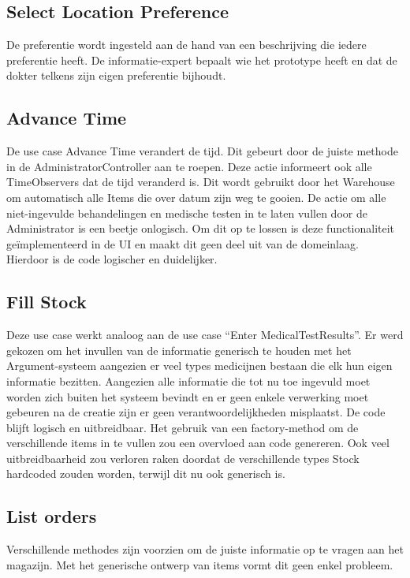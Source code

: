 \subsection{Select Location Preference}
De preferentie wordt ingesteld aan de hand van een beschrijving die iedere preferentie heeft. 
De informatie-expert bepaalt wie het prototype heeft en dat de dokter telkens zijn eigen preferentie bijhoudt.

\subsection{Advance Time}
De use case Advance Time verandert de tijd. Dit gebeurt door de juiste methode in de AdministratorController aan te roepen. 
Deze actie informeert ook alle TimeObservers dat de tijd veranderd is. Dit wordt gebruikt door het Warehouse om automatisch alle Items die over datum zijn weg te gooien. 
De actie om alle niet-ingevulde behandelingen en medische testen in te laten vullen door de Administrator is een beetje onlogisch. 
Om dit op te lossen is deze functionaliteit geïmplementeerd in de UI en maakt dit geen deel uit van de domeinlaag. 
Hierdoor is de code logischer en duidelijker.

\subsection{Fill Stock}
Deze use case werkt analoog aan de use case ``Enter MedicalTestResults''. 
Er werd gekozen om het invullen van de informatie generisch te houden met het Argument-systeem aangezien er veel types medicijnen bestaan die elk hun eigen informatie bezitten. 
Aangezien alle informatie die tot nu toe ingevuld moet worden zich buiten het systeem bevindt en er geen enkele verwerking moet gebeuren na de creatie zijn er geen verantwoordelijkheden misplaatst.
De code blijft logisch en uitbreidbaar. Het gebruik van een factory-method om de verschillende items in te vullen zou een overvloed aan code genereren. 
Ook veel uitbreidbaarheid zou verloren raken doordat de verschillende types Stock hardcoded zouden worden, terwijl dit nu ook generisch is.

\subsection{List orders}
Verschillende methodes zijn voorzien om de juiste informatie op te vragen aan het magazijn. Met het generische ontwerp van items vormt dit geen enkel probleem.

